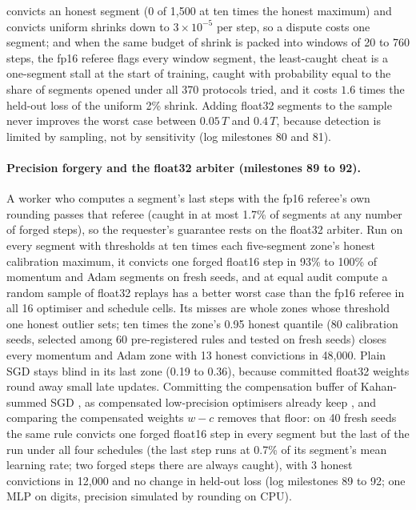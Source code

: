 \documentclass[sigconf,anonymous]{acmart}
\begin{document}
convicts an honest segment (0 of 1{,}500 at ten times the honest maximum) and convicts uniform shrinks down to $3\times10^{-5}$ per step, so a dispute costs one segment; and when the same budget of shrink is packed into windows of 20 to 760 steps, the fp16 referee flags every window segment, the least-caught cheat is a one-segment stall at the start of training, caught with probability equal to the share of segments opened under all 370 protocols tried, and it costs $1.6$ times the held-out loss of the uniform 2\% shrink. Adding float32 segments to the sample never improves the worst case between $0.05\,T$ and $0.4\,T$, because detection is limited by sampling, not by sensitivity (log milestones 80 and 81).

\paragraph{Precision forgery and the float32 arbiter (milestones 89 to 92).} A worker who computes a segment's last steps with the fp16 referee's own rounding passes that referee (caught in at most 1.7\% of segments at any number of forged steps), so the requester's guarantee rests on the float32 arbiter. Run on every segment with thresholds at ten times each five-segment zone's honest calibration maximum, it convicts one forged float16 step in 93\% to 100\% of momentum and Adam segments on fresh seeds, and at equal audit compute a random sample of float32 replays has a better worst case than the fp16 referee in all 16 optimiser and schedule cells. Its misses are whole zones whose threshold one honest outlier sets; ten times the zone's 0.95 honest quantile (80 calibration seeds, selected among 60 pre-registered rules and tested on fresh seeds) closes every momentum and Adam zone with 13 honest convictions in 48{,}000. Plain SGD stays blind in its last zone (0.19 to 0.36), because committed float32 weights round away small late updates. Committing the compensation buffer of Kahan-summed SGD \citep{kahan1965further}, as compensated low-precision optimisers already keep \citep{zamirai2020revisiting}, and comparing the compensated weights $w-c$ removes that floor: on 40 fresh seeds the same rule convicts one forged float16 step in every segment but the last of the run under all four schedules (the last step runs at 0.7\% of its segment's mean learning rate; two forged steps there are always caught), with 3 honest convictions in 12{,}000 and no change in held-out loss (log milestones 89 to 92; one MLP on digits, precision simulated by rounding on CPU).
\end{document}
